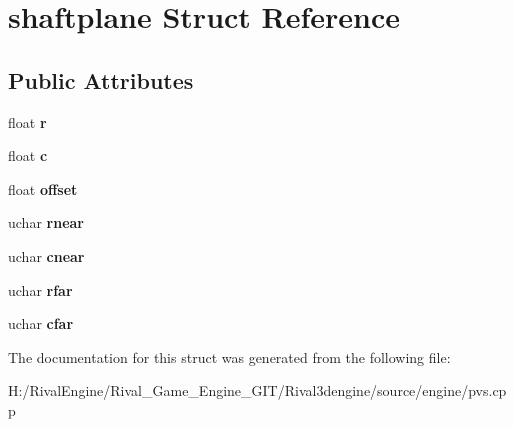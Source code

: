 \hypertarget{structshaftplane}{}\section{shaftplane Struct Reference}
\label{structshaftplane}
\subsection*{Public Attributes}
\begin{DoxyCompactItemize}
\item 
\mbox{\label{structshaftplane_ad453143b1ec996ee784a1b8e636a3ea3}} 
float {\bfseries r}
\item 
\mbox{\label{structshaftplane_ac1ad2db624e55d2fd1f7b1fdab721167}} 
float {\bfseries c}
\item 
\mbox{\label{structshaftplane_a2766f25a381213f5341bf179015b2e8d}} 
float {\bfseries offset}
\item 
\mbox{\label{structshaftplane_afce4f8265bf3cb456dfe0fef9b1bebcb}} 
uchar {\bfseries rnear}
\item 
\mbox{\label{structshaftplane_a90d80fe2a22b73c8d0cf0601d86a2912}} 
uchar {\bfseries cnear}
\item 
\mbox{\label{structshaftplane_a0c4960092bd0d76d4608fddb51e04010}} 
uchar {\bfseries rfar}
\item 
\mbox{\label{structshaftplane_aab356659eb5214e80533315b45450f3d}} 
uchar {\bfseries cfar}
\end{DoxyCompactItemize}


The documentation for this struct was generated from the following file\+:\begin{DoxyCompactItemize}
\item 
H\+:/\+Rival\+Engine/\+Rival\+\_\+\+Game\+\_\+\+Engine\+\_\+\+G\+I\+T/\+Rival3dengine/source/engine/pvs.\+cpp\end{DoxyCompactItemize}
